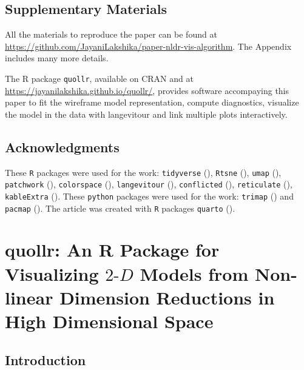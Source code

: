 \documentclass[
  11pt,
  a4paper,
]{report}
\begin{document}
\section{Supplementary Materials}\label{sec-supplementary}

All the materials to reproduce the paper can be found at
\url{https://github.com/JayaniLakshika/paper-nldr-vis-algorithm}. The
Appendix includes many more details.

The R package \texttt{quollr}, available on CRAN and at
\url{https://jayanilakshika.github.io/quollr/}, provides software
accompaying this paper to fit the wireframe model representation,
compute diagnostics, visualize the model in the data with langevitour
and link multiple plots interactively.

\section{Acknowledgments}\label{acknowledgments}

These \texttt{R} packages were used for the work: \texttt{tidyverse}
(), \texttt{Rtsne}
(), \texttt{umap}
(), \texttt{patchwork}
(), \texttt{colorspace}
(), \texttt{langevitour}
(), \texttt{conflicted}
(), \texttt{reticulate}
(), \texttt{kableExtra}
(). These \texttt{python} packages were
used for the work: \texttt{trimap}
() and \texttt{pacmap}
(). The article was created
with \texttt{R} packages \texttt{quarto}
().


\chapter{\texorpdfstring{quollr: An R Package for Visualizing
\(2\text{-}D\) Models from Non-linear Dimension Reductions in High
Dimensional
Space}{quollr: An R Package for Visualizing 2\textbackslash text\{-\}D Models from Non-linear Dimension Reductions in High Dimensional Space}}\label{sec-third-paper}

\section{Introduction}\label{introduction-1}
\end{document}
